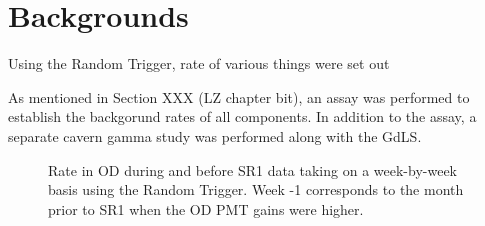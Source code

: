 \section{Backgrounds}
\par
Using the Random Trigger, rate of various things were set out

\par
As mentioned in Section XXX (LZ chapter bit), an assay was performed to establish the backgorund rates of all components.
In addition to the assay, a separate cavern gamma study was performed along with the GdLS.


\begin{figure}[!htbp]
    \centering
    \caption{Rate in OD during and before SR1 data taking on a week-by-week basis using the Random Trigger.
    Week -1 corresponds to the month prior to SR1 when the OD PMT gains were higher.}
    \label{fig:OD_SR1_Rate}
\end{figure}


